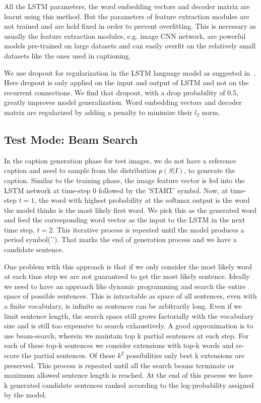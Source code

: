 All the LSTM parameters, the word embedding vectors and decoder matrix are
learnt using this method.
But the parameters of feature extraction modules are not trained and are held
fixed in order to prevent overfitting. 
This is necessary as usually the feature extraction modules, e.g. image CNN
network, are powerful models pre-trained on large datasets and can easily
overfit on the relatively small datasets like the ones used in captioning.

We use dropout for regularization in the LSTM language model as suggested
in~\cite{ZarembaSV14}.
Here dropout is only applied on the input and output of LSTM and not on the
recurrent connections.
We find that dropout, with a drop probability of 0.5, greatly improves model
generalization.
Word embedding vectors and decoder matrix are regularized by adding a penalty to
minimize their $l_2$ norm.

\subsection{Test Mode: Beam Search}
In the caption generation phase for test images, we do not have a reference
caption and need to sample from the distribution $p(S|I)$, to generate the
caption.
Similar to the training phase, the image feature vector is fed into the LSTM
network at time-step 0 followed by the 'START' symbol.
Now, at time-step $t=1$, the word with highest probability at the softmax output
is the word the model thinks is the most likely first word.
We pick this as the generated word and feed the corresponding word vector as the
input to the LSTM in the next time step, $t=2$.
This iterative process is repeated until the model produces a period symbol('.').
That marks the end of generation process and we have a candidate sentence.

One problem with this approach is that if we only consider the most likely word
at each time step we are not guaranteed to get the most likely sentence.
Ideally we need to have an approach like dynamic programming and search the
entire space of possible sentences.
This is intractable as space of all sentences, even with a finite vocabulary, is
infinite as sentences can be arbitrarily long.
Even if we limit sentence length, the search space still grows factorially with
the vocabulary size and is still too expensive to search exhaustively.
A good approximation is to use beam-search, wherein we maintain top k partial
sentences at each step.
For each of these top-k sentences we consider extensions with top-k words and
re-score the partial sentences.
Of these $k^2$ possibilities only best k extensions are preserved.
This process is repeated until all the search beams terminate or maximum allowed
sentence length is reached.
At the end of this process we have k generated candidate sentences ranked
according to the log-probability assigned by the model.

